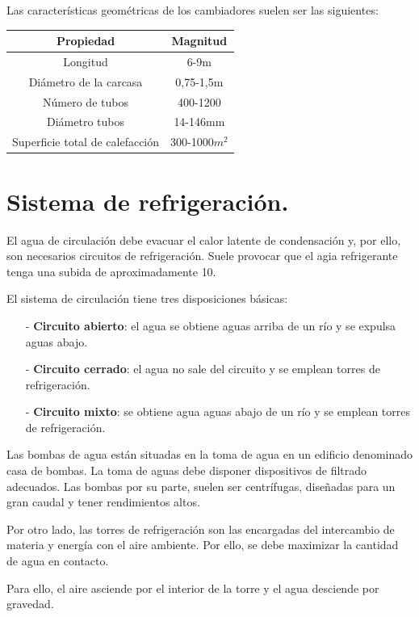Las características geométricas de los cambiadores suelen ser las siguientes:
\begin{table}[H]
	\centering
	\renewcommand{\arraystretch}{1.5}
	\begin{tabular}{cc}
		\hline
		Propiedad&Magnitud\\
		\hline
		Longitud&6-9m\\
		\hline
		Diámetro de la carcasa&0,75-1,5m\\
		\hline
		Número de tubos&400-1200\\
		\hline
		Diámetro tubos&14-146mm\\
		\hline
		Superficie total de calefacción&300-1000$m^2$\\
		\hline
		
	\end{tabular}
\end{table}

\section{Sistema de refrigeración.}
El agua de circulación debe evacuar el calor latente de condensación y, por ello, son necesarios circuitos de refrigeración. Suele provocar que el agia refrigerante tenga una subida de aproximadamente 10\grado.


El sistema de circulación tiene tres disposiciones básicas:
\begin{itemize}
	\item [-] \textbf{Circuito abierto}: el agua se  obtiene aguas arriba de un río y se expulsa aguas abajo.
	\item [-] \textbf{Circuito cerrado}: el agua no sale del circuito y se emplean torres de refrigeración.
	\item [-] \textbf{Circuito mixto}: se obtiene agua aguas abajo de un río y se emplean torres de refrigeración.
\end{itemize}
	
Las bombas de agua están situadas en la toma de agua en un edificio denominado casa de bombas. La toma de aguas debe disponer dispositivos de filtrado adecuados. Las bombas por su parte, suelen ser centrífugas, diseñadas para un gran caudal y tener rendimientos altos.


Por otro lado, las torres de refrigeración son las encargadas del intercambio de materia y energía con el aire ambiente. Por ello, se debe maximizar la cantidad de agua en contacto.


Para ello, el aire asciende por el interior de la torre y el agua desciende por gravedad.


